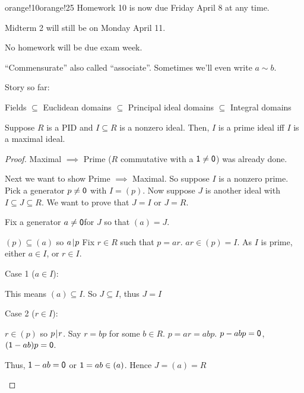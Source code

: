 \documentclass[notes.tex]{subfiles}
\begin{document}
\begin{classnote}{orange!10}{orange!25}
	Homework 10 is now due Friday April 8 at any time.

	Midterm 2 will still be on Monday April 11.

	No homework will be due exam week.
\end{classnote}

\begin{remark}
	``Commensurate'' also called ``associate''.
	Sometimes we'll even write $a\sim b$.
\end{remark}

Story so far:
\begin{center}
	Fields $\subseteq$ Euclidean domains $\subseteq$ Principal ideal domains $\subseteq$ Integral domains %
\end{center}

\begin{proposition}
	Suppose $R$ is a PID and $I\subseteq R$ is a nonzero ideal. Then, $I$ is a prime ideal iff $I$ is a maximal ideal.
\end{proposition}

\begin{proof}
	Maximal $\implies$ Prime ($R$ commutative with a $\mathsf{1}\ne\mathsf{0}$) was already done.

	Next we want to show Prime $\implies$ Maximal.
	So suppose $I$ is a nonzero prime. Pick a generator $p\ne\mathsf{0}$ with $I = (p)$. Now suppose $J$ is another ideal with $I\subseteq J \subseteq R$. We want to prove that $J=I$ or $J=R$.

	Fix a generator $a\ne\mathsf{0}$for $J$ so that $(a) = J$.

	$(p)\subseteq (a)$ so $a\mkern2mu|\mkern1mu p$ Fix $r\in R$ such that $p = ar$.
	$ar\in (p) = I$. As $I$ is prime, either $a\in I$, or $r\in I$.

	Case 1 ($a\in I$):
	\begin{tabin}
		This means $(a) \subseteq I$. So $J\subseteq I$, thus $J=I$
	\end{tabin}

	Case 2 ($r\in I$):
	\begin{tabin}
		$r\in (p)$ so $p\mkern2mu|\mkern1mu r$.
		Say $r=bp$ for some $b\in R$.
		$p=ar=abp$.
		$p-abp = \mathsf{0}$, $(\mathsf{1}-ab)p=\mathsf{0}$.

		Thus, $\mathsf{1}-ab = \mathsf{0}$ or $\mathsf{1} = ab \in (a)$. Hence $J = (a) = R$
	\end{tabin}
\end{proof}
\end{document}
